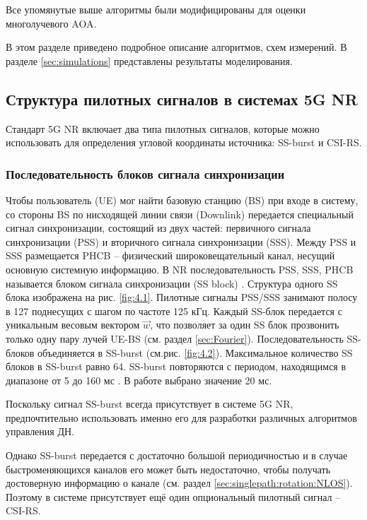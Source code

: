 Все упомянутые выше алгоритмы были модифицированы для оценки многолучевого AOA.

В этом разделе приведено подробное описание алгоритмов, схем измерений. В
разделе \ref{sec:simulations} представлены результаты моделирования.


\subsection{Структура пилотных сигналов в системах 5G NR}
\label{sec:ssburst}

Стандарт 5G NR включает два типа пилотных сигналов, которые можно использовать для определения угловой координаты источника: SS-burst
и CSI-RS.

\subsubsection{Последовательность блоков сигнала синхронизации}

Чтобы пользователь (UE) мог найти базовую станцию (BS) при входе в систему, со
стороны BS по нисходящей линии связи (Downlink) передается специальный сигнал
синхронизации, состоящий из двух частей: первичного сигнала синхронизации (PSS)
и вторичного сигнала синхронизации (SSS). Между PSS и SSS размещается PHCB --
физический широковещательный канал, несущий основную системную информацию. В NR 
последовательность PSS, SSS, PHCB называется блоком сигнала синхронизации (SS
block) \cite{Dahlman2018}. Структура одного SS блока изображена на рис. \ref{fig:4.1}. 
Пилотные сигналы PSS/SSS занимают полосу в 127 поднесущих с шагом по частоте 125 кГц. 
Каждый SS-блок передается с уникальным весовым вектором $\vec w$, что 
позволяет за один SS блок прозвонить только одну пару лучей UE-BS (см. раздел \ref{sec:Fourier}).  
Последовательность SS-блоков объединяется в SS-burst (см.рис. \ref{fig:4.2}).  
Максимальное количество SS блоков в SS-burst равно 64. 
SS-burst повторяются с периодом, находящимся  в диапазоне от 5 до 160 мс \cite{Dahlman2018}.  
В работе выбрано значение 20 мс.

Поскольку сигнал SS-burst всегда присутствует в системе 5G NR, предпочтительно 
использовать именно его для разработки различных алгоритмов управления ДН. 

Однако SS-burst передается с достаточно большой периодичностью и в случае 
быстроменяющихся каналов его может быть недостаточно, чтобы получать достоверную
информацию о канале (см. раздел \ref{sec:singlepath:rotation:NLOS}). Поэтому в 
системе присутствует ещё один опциональный пилотный сигнал -- CSI-RS.


